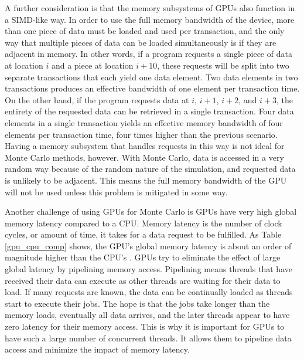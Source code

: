 \documentclass[preprint,12pt]{elsarticle}
\begin{document}
A further consideration is that the memory subsystems of GPUs also function in a SIMD-like way.  In order to use the full memory bandwidth of the device, more than one piece of data must be loaded and used per transaction, and the only way that multiple pieces of data can be loaded simultaneously is if they are adjacent in memory.  In other words, if a program requests a single piece of data at location $i$ and a piece at location $i+10$, these requests will be split into two separate transactions that each yield one data element. Two data elements in two transactions produces an effective bandwidth of one element per transaction time.  On the other hand, if the program requests data at $i$, $i+1$, $i+2$, and $i+3$, the entirety of the requested data can be retrieved in a single transaction.  Four data elements in a single transaction yields an effective memory bandwidth of four elements per transaction time, four times higher than the previous scenario.  Having a memory subsystem that handles requests in this way is not ideal for Monte Carlo methods, however.  With Monte Carlo, data is accessed in a very random way because of the random nature of the simulation, and requested data is unlikely to be adjacent.  This means the full memory bandwidth of the GPU will not be used unless this problem is mitigated in some way.

Another challenge of using GPUs for Monte Carlo is GPUs have very high global memory latency compared to a CPU.  Memory latency is the number of clock cycles, or amount of time, it takes for a data request to be fulfilled.  As Table \ref{gpu_cpu_comp} shows, the GPU's global memory latency is about an order of magnitude higher than the CPU's \cite{cpu_latency,cuda}.  GPUs try to eliminate the effect of large global latency by pipelining memory access.  Pipelining means threads that have received their data can execute as other threads are waiting for their data to load.  If many requests are known, the data can be continually loaded as threads start to execute their jobs.  The hope is that the jobs take longer than the memory loads, eventually all data arrives, and the later threads appear to have zero latency for their memory access.  This is why it is important for GPUs to have such a large number of concurrent threads.  It allows them to pipeline data access and minimize the impact of memory latency.
\end{document}

